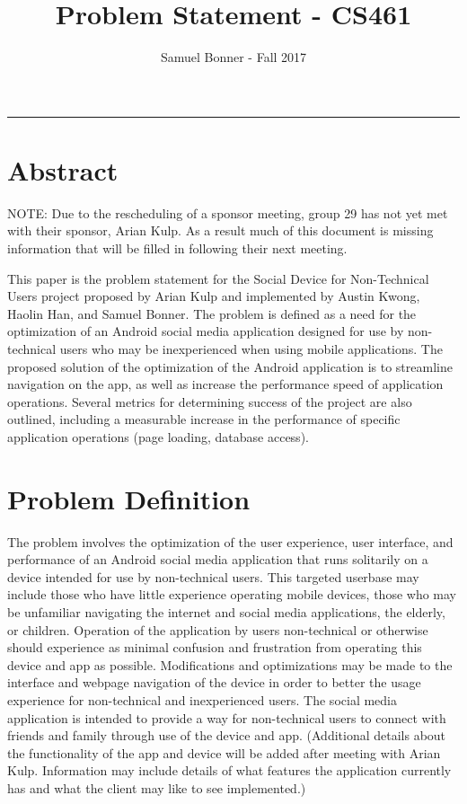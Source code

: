 \documentclass[letterpaper,10pt,fleqn,draftclsnofoot,onecolumn]{article}
\title{Problem Statement - CS461}
\author{Samuel Bonner - Fall 2017}
\begin{document}
\maketitle
\hrule

\section*{Abstract}

NOTE: Due to the rescheduling of a sponsor meeting, group 29 has not yet met with their sponsor, Arian Kulp. As a result much of this document is missing information that will be filled in following their next meeting.

This paper is the problem statement for the Social Device for Non-Technical Users project proposed by Arian Kulp and implemented by Austin Kwong, Haolin Han, and Samuel Bonner. The problem is defined as a need for the optimization of an Android social media application designed for use by non-technical users who may be inexperienced when using mobile applications. The proposed solution of the optimization of the Android application is to streamline navigation on the app, as well as increase the performance speed of application operations. Several metrics for determining success of the project are also outlined, including a measurable increase in the performance of specific application operations (page loading, database access).

\pagebreak

\section*{Problem Definition}

The problem involves the optimization of the user experience, user interface, and performance of an Android social media application that runs solitarily on a device intended for use by non-technical users. This targeted userbase may include those who have little experience operating mobile devices, those who may be unfamiliar navigating the internet and social media applications, the elderly, or children. Operation of the application by users non-technical or otherwise should experience as minimal confusion and frustration from operating this device and app as possible. Modifications and optimizations may be made to the interface and webpage navigation of the device in order to better the usage experience for non-technical and inexperienced users. The social media application is intended to provide a way for non-technical users to connect with friends and family through use of the device and app. (Additional details about the functionality of the app and device will be added after meeting with Arian Kulp. Information may include details of what features the application currently has and what the client may like to see implemented.) 
\end{document}
